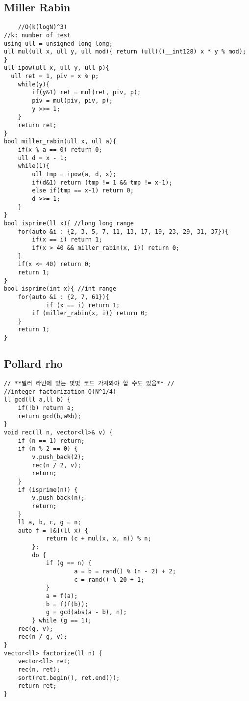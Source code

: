 \documentclass[landscape, 8pt, a4paper, oneside, twocolumn]{extarticle}
\begin{document}
\subsection{Miller Rabin}
\begin{verbatim}
    //O(k(logN)^3)
//k: number of test
using ull = unsigned long long;
ull mul(ull x, ull y, ull mod){ return (ull)((__int128) x * y % mod); }
ull ipow(ull x, ull y, ull p){
  ull ret = 1, piv = x % p;
	while(y){
		if(y&1) ret = mul(ret, piv, p);
		piv = mul(piv, piv, p);
		y >>= 1;
	}
	return ret;
}
bool miller_rabin(ull x, ull a){
	if(x % a == 0) return 0;
	ull d = x - 1;
	while(1){
		ull tmp = ipow(a, d, x);
		if(d&1) return (tmp != 1 && tmp != x-1);
		else if(tmp == x-1) return 0;
		d >>= 1;
	}
}
bool isprime(ll x){ //long long range
	for(auto &i : {2, 3, 5, 7, 11, 13, 17, 19, 23, 29, 31, 37}){
		if(x == i) return 1;
		if(x > 40 && miller_rabin(x, i)) return 0;
	}
	if(x <= 40) return 0;
	return 1;
}
bool isprime(int x){ //int range
	for(auto &i : {2, 7, 61}){
    		if (x == i) return 1;
		if (miller_rabin(x, i)) return 0;
	}
	return 1;
}
\end{verbatim}
\newpage
\subsection{Pollard rho}
\begin{verbatim}
// **밀러 라빈에 있는 몇몇 코드 가져와야 할 수도 있음** //
//integer factorization O(N^1/4)
ll gcd(ll a,ll b) {
    if(!b) return a;
    return gcd(b,a%b);
}
void rec(ll n, vector<ll>& v) {
	if (n == 1) return;
	if (n % 2 == 0) {
		v.push_back(2);
		rec(n / 2, v);
		return;
	}
	if (isprime(n)) {
		v.push_back(n);
		return;
	}
	ll a, b, c, g = n;
	auto f = [&](ll x) {
        	return (c + mul(x, x, n)) % n;
    	};
    	do {
        	if (g == n) {
            		a = b = rand() % (n - 2) + 2;
            		c = rand() % 20 + 1;
        	}
        	a = f(a);
        	b = f(f(b));
        	g = gcd(abs(a - b), n);
    	} while (g == 1);
	rec(g, v);
	rec(n / g, v);
}
vector<ll> factorize(ll n) {
	vector<ll> ret;
	rec(n, ret);
	sort(ret.begin(), ret.end());
	return ret;
}
\end{verbatim}
\newpage
\end{document}
